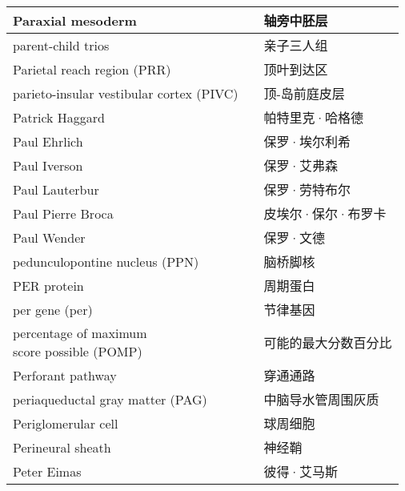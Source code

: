 \begin{longtable}{lll}
	\midrule
	Paraxial mesoderm     && 轴旁中胚层   \\
	
	\midrule
	parent-child trios     && 亲子三人组   \\
	
	\midrule
	Parietal reach region (PRR)     && 顶叶到达区   \\
	
	\midrule
	parieto-insular vestibular cortex (PIVC)     && 顶-岛前庭皮层   \\
	
	\midrule
	Patrick Haggard     && 帕特里克·哈格德   \\
	
	\midrule
	Paul Ehrlich     && 保罗·埃尔利希  \\
	
	\midrule
	Paul Iverson     && 保罗·艾弗森  \\
	
	\midrule
	Paul Lauterbur     && 保罗·劳特布尔  \\
	
	\midrule
	Paul Pierre Broca     && 皮埃尔·保尔·布罗卡  \\
	
	\midrule
	Paul Wender     && 保罗·文德  \\
	
	\midrule
	pedunculopontine nucleus (PPN)     && 脑桥脚核   \\
	
	\midrule
	PER protein     && 周期蛋白   \\
	
	\midrule
	per gene (per)     && 节律基因   \\
	
	\midrule
	\makecell{percentage of maximum \\score possible (POMP)}     && 可能的最大分数百分比   \\
	
	\midrule
	Perforant pathway     && 穿通通路   \\
	
	\midrule
	periaqueductal gray matter (PAG)    && 中脑导水管周围灰质   \\
	
	\midrule
	Periglomerular cell     && 球周细胞   \\
	
	\midrule
	Perineural sheath     && 神经鞘   \\
	
	\midrule
	Peter Eimas     && 彼得·艾马斯   \\
	

\end{longtable}
